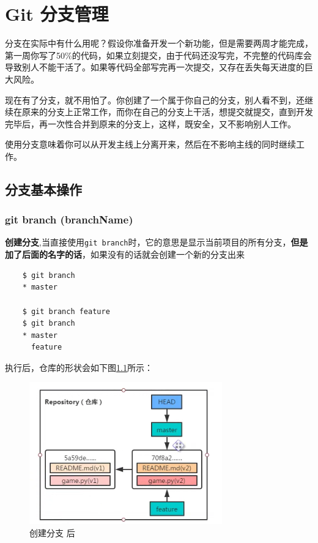 \documentclass[UTF8,a4paper,12pt]{ctexbook}
\begin{document}
			
  \chapter{Git 分支管理}
	  分支在实际中有什么用呢？假设你准备开发一个新功能，但是需要两周才能完成，第一周你写了50\%的代码，如果立刻提交，由于代码还没写完，不完整的代码库会导致别人不能干活了。如果等代码全部写完再一次提交，又存在丢失每天进度的巨大风险。
	  
	  现在有了分支，就不用怕了。你创建了一个属于你自己的分支，别人看不到，还继续在原来的分支上正常工作，而你在自己的分支上干活，想提交就提交，直到开发完毕后，再一次性合并到原来的分支上，这样，既安全，又不影响别人工作。
	  
	  使用分支意味着你可以从开发主线上分离开来，然后在不影响主线的同时继续工作。 
	  \section{分支基本操作}
		  \subsection{git branch (branchName)}
			  \textbf{创建分支},当直接使用\verb|git branch|时，它的意思是显示当前项目的所有分支，\textbf{但是加了后面的名字的话}，如果没有的话就会创建一个新的分支出来
			  \begin{lstlisting}
	$ git branch
	* master
	
	$ git branch feature
	$ git branch
	* master
	  feature
			  \end{lstlisting}
			  
			  执行后，仓库的形状会如下图\ref{branch-after}所示：
				  \begin{figure}[htbp]
				  	\centering
				  	\includegraphics[scale = 0.7]{figure/branch.png}
				  	\caption{创建分支 后}
				  	\label{branch-after}
				  \end{figure}
			  
\end{document}
